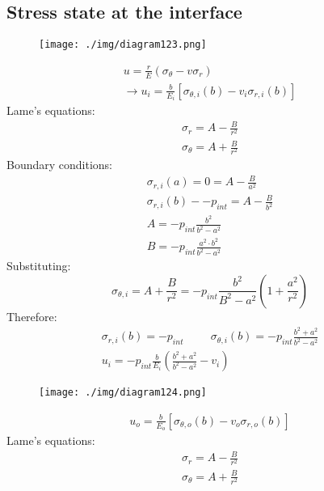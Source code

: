 \subsection{Stress state at the interface}
\begin{figure}[H]
    \centering
    \texttt{[image: ./img/diagram123.png]}
    \caption{}
\end{figure}
\begin{gather}
    u = \frac{r}{E}\left(\sigma_{\theta} - v \sigma_r\right)\\
    \rightarrow u_i = \frac{b}{E_i}\left[\sigma_{\theta, i} \left(b\right) - v_i \sigma_{r,i} (b)\right]
\end{gather}
Lame's equations:
\begin{gather}
    \sigma_r = A - \frac{B}{r^2}\\
    \sigma_{\theta} = A + \frac{B}{r^2}
\end{gather}
Boundary conditions:
\begin{gather}
    \sigma_{r,i}(a) = 0 = A - \frac{B}{a^2}\\
    \sigma_{r,i}(b) - -p_{int} = A - \frac{B}{b^2}\\
    A = -p_{int}\frac{b^2}{b^2 - a^2}\\
    B = -p_{int}\frac{a^2 \cdot b^2}{b^2 - a^2}
\end{gather}
Substituting:
\begin{equation}
    \sigma_{\theta,i} = A + \frac{B}{r^2} = -p_{int}\frac{b^2}{B^2 - a^2} \left(1 + \frac{a^2}{r^2}\right)
\end{equation}
Therefore:
\begin{gather}
    \sigma_{r,i}(b) = -p_{int} \hspace{1cm} \sigma_{\theta,i}(b) = -p_{int}\frac{b^2 + a^2}{b^2 - a^2}\\
    u_i = -p_{int} \frac{b}{E_i} \left(\frac{b^2 + a^2}{b^2 - a^2} - v_i\right)
\end{gather}
\begin{figure}[H]
    \centering
    \texttt{[image: ./img/diagram124.png]}
    \caption{}
\end{figure}
\begin{gather}
    u_o = \frac{b}{E_o}\left[\sigma_{\theta,o} (b) - v_o \sigma_{r,o}(b)\right]
\end{gather}
Lame's equations:
\begin{gather}
    \sigma_r = A - \frac{B}{r^2}\\
    \sigma_{\theta} = A + \frac{B}{r^2}
\end{gather}
